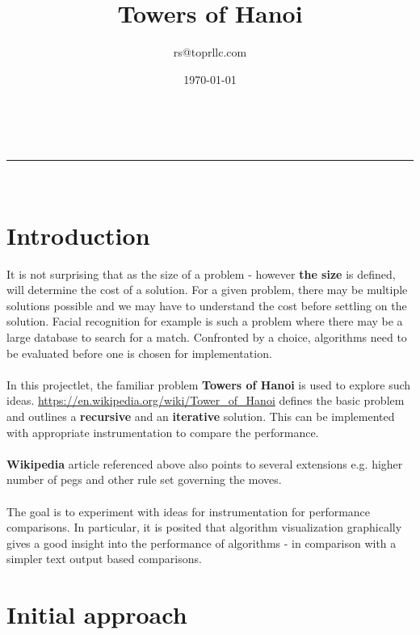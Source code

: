\documentclass[a4paper,11pt]{article}
\makeatletter
\newcommand{\linia}{\rule{\linewidth}{0.5pt}}
\theoremstyle{mytheor}
\renewcommand{\maketitle}{
\begin{center}
\vspace{2ex}
{\huge \textsc{\@title}}
\vspace{1ex}
\\
\linia\\
\@author \hfill \@date
\vspace{4ex}
\end{center}
}
\makeatother
\begin{document}
\title{Towers of Hanoi}

\author{rs@toprllc.com}

\date{\today}

\maketitle

\section*{Introduction}

It is not surprising that as the size of a problem - however \textbf{the size} is defined, will determine the cost of a solution. For a given problem, there may be multiple solutions possible and we may have to understand the cost before settling on the solution. Facial recognition for example is such a problem where there may be a large database to search for a match. Confronted by a choice, algorithms need to be evaluated before one is chosen for implementation.

\paragraph{}In this projectlet, the familiar problem \textbf{Towers of Hanoi} is used to explore such ideas. \url{https://en.wikipedia.org/wiki/Tower_of_Hanoi} defines the basic problem and outlines a \textbf{recursive} and an \textbf{iterative} solution. This can be implemented with appropriate instrumentation to compare the performance.

\paragraph{}\textbf{Wikipedia} article referenced above also points to several extensions e.g. higher number of pegs and other rule set governing the moves.

\paragraph{}The goal is to experiment with ideas for instrumentation for performance comparisons. In particular, it is posited that algorithm visualization graphically gives a good insight into the performance of algorithms - in comparison with a simpler text output based comparisons.

\section*{Initial approach}
\end{document}
